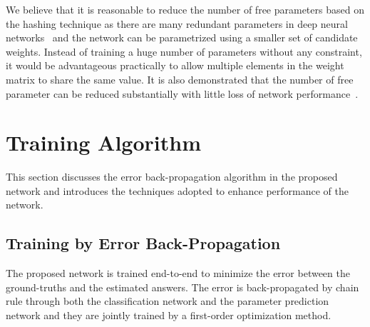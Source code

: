 \documentclass[10pt,twocolumn,letterpaper]{article}
\begin{document}
We believe that it is reasonable to reduce the number of free parameters based on the hashing technique as there are many redundant parameters in deep neural networks~\cite{denil2013predicting} and the network can be parametrized using a smaller set of candidate weights.
Instead of training a huge number of parameters without any constraint, it would be advantageous practically to allow multiple elements in the weight matrix to share the same value.
It is also demonstrated that the number of free parameter can be reduced substantially with little loss of network performance~\cite{Hashing}. 





\section{Training Algorithm}
\label{sec:training}

This section discusses the error back-propagation algorithm in the proposed network and introduces the techniques adopted to enhance performance of the network.


\subsection{Training by Error Back-Propagation}



The proposed network is trained end-to-end to minimize the error between the ground-truths and the estimated answers.
The error is back-propagated by chain rule through both the classification network and the parameter prediction network and they are jointly trained by a first-order optimization method.
\end{document}
